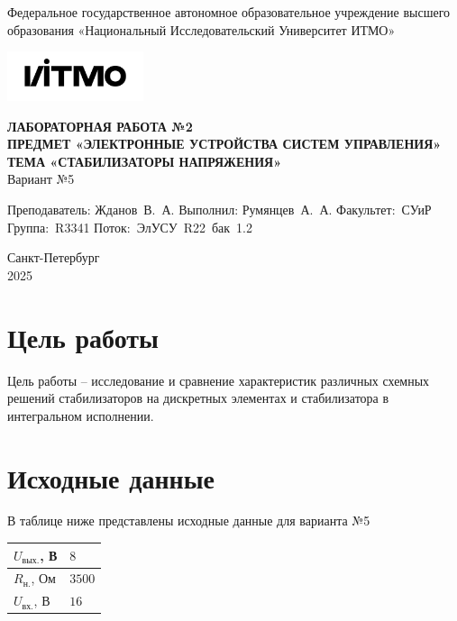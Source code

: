 \documentclass[a4paper, 12pt]{article}
\begin{document}
    \begin{titlepage}

        \begin{center}
        Федеральное государственное автономное образовательное учреждение высшего образования
        «Национальный Исследовательский Университет ИТМО»
        \vfill
        
        \includegraphics[width=0.3\textwidth]{itmo.png} %

        {\large\bf ЛАБОРАТОРНАЯ РАБОТА №2}\\
        {\large\bf ПРЕДМЕТ «ЭЛЕКТРОННЫЕ УСТРОЙСТВА СИСТЕМ УПРАВЛЕНИЯ»}\\
        {\large\bf ТЕМА «СТАБИЛИЗАТОРЫ НАПРЯЖЕНИЯ»}\\
        Вариант №5
        \vfill

        \begin{flushright}
            \begin{minipage}{.45\textwidth}
            {
                \hbox{Преподаватель:}
                \hbox{Жданов В. А.}
                \hbox{}
                \hbox{Выполнил:}
                \hbox{Румянцев А. А.}
                \hbox{}
                \hbox{Факультет: СУиР}
                \hbox{Группа: R3341}
                \hbox{Поток: ЭлУСУ R22 бак 1.2}
            }
            \end{minipage}
        \end{flushright}
        \vfill
  
        Санкт-Петербург\\
        2025
        \end{center}
    \end{titlepage}
    
    \tableofcontents

    \newpage
    \section{Цель работы}
    Цель работы -- исследование и сравнение характеристик различных схемных решений
    стабилизаторов на дискретных элементах и стабилизатора в интегральном исполнении.


    \section{Исходные данные}
    В таблице ниже представлены исходные данные для варианта №5
    \begin{center}
        \begin{tabular}{ | m{4em} | m{2em}| } 
        \hline
        $U_{\text{вых.}}$, В& $8$\\ 
        \hline
        $R_{\text{н.}}$, Ом& $3500$\\ 
        \hline
        $U_{\text{вх.}}$, В& $16$\\ 
        \hline
        \end{tabular}
    \end{center}
\end{document}
